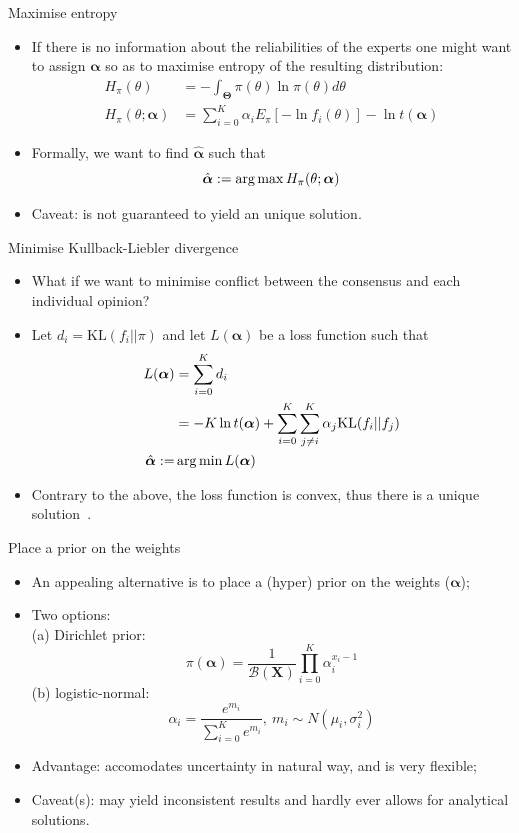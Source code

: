 \begin{frame}{Maximise entropy}
 \begin{itemize}
  \item If there is no information about the reliabilities of the experts one might want to assign $\boldsymbol\alpha$ so as to maximise entropy of the resulting distribution:
  \begin{align*}
   H_{\pi}(\theta) &=-\int_{\boldsymbol\Theta}\pi(\theta)\ln\pi(\theta)d\theta \\
   H_{\pi}(\theta; \boldsymbol\alpha) &= \sum_{i=0}^{K} \alpha_i E_{\pi}[ - \ln f_i(\theta)] - \ln t(\boldsymbol\alpha)
  \end{align*}
  \item Formally, we want to find $\hat{\boldsymbol\alpha}$ such that
  \[\hat{\boldsymbol\alpha}:= \operatorname*{arg\,max} H_{\pi}(\theta; \boldsymbol\alpha)  \]
  \item Caveat: is not guaranteed to yield an unique solution.
 \end{itemize}
\end{frame}
\begin{frame}{Minimise Kullback-Liebler divergence}
\begin{itemize}
 \item What if we want to minimise conflict between the consensus and each individual opinion?
 \item Let $d_i = \text{KL}(f_i || \pi)$ and let $L(\boldsymbol\alpha)$ be a loss function such that
\begin{align}
L(\boldsymbol\alpha) &= \sum_{i=0}^Kd_i \\
     &= -K\ln t(\boldsymbol\alpha) + \sum_{i=0}^K\sum_{j\neq i}^K\alpha_j\text{KL}(f_i||f_j) \\
     \hat{\boldsymbol\alpha}:=& \operatorname*{arg\,min} L(\boldsymbol\alpha)   
\end{align}
\item Contrary to the above, the loss function is convex, thus there is a unique solution~\citep{rufo2012A}.
\end{itemize}
\end{frame}
\begin{frame}{Place a prior on the weights}
 \begin{itemize}
  \item An appealing alternative is to place a (hyper) prior on the weights ($\boldsymbol\alpha$);
  \item Two options:\\
 (a) Dirichlet prior:
\[ \pi(\boldsymbol\alpha) = \frac{1}{\mathcal{B}(\boldsymbol X)}\prod_{i=0}^K \alpha_i^{x_i-1}\]
 (b) logistic-normal:
 \[\alpha_i = \frac{e^{m_i}}{\sum_{i=0}^{K} e^{m_i}}, \: m_i \sim N(\mu_i, \sigma_i^2)\]
 \item Advantage: accomodates uncertainty in natural way, and is very flexible;
 \item Caveat(s): may yield inconsistent results and hardly ever allows for analytical solutions.
 \end{itemize}
\end{frame}
